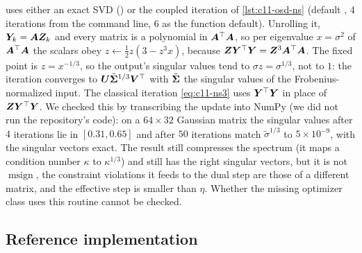 \begin{implnote}[title={In the code: the matrix sign is not the polar factor as written}]
 uses either an exact SVD () or the coupled iteration of
\cref{lst:c11-osd-ns} (default , $4$ iterations from the command line, $6$ as the
function default). Unrolling it, $\bm{Y}_k = \bm{A}\bm{Z}_k$ and every matrix is a polynomial in
$\bm{A}^{\top}\bm{A}$, so per eigenvalue $x = \sigma^2$ of $\bm{A}^{\top}\bm{A}$ the scalars obey
$z \leftarrow \tfrac12 z(3 - z^3x)$, because $\bm{Z}\bm{Y}^{\top}\bm{Y} = \bm{Z}^3\bm{A}^{\top}\bm{A}$. The fixed point is
$z = x^{-1/3}$, so the output's singular values tend to $\sigma z = \sigma^{1/3}$, not to $1$: the
iteration converges to $\bm{U}\tilde{\bm{\Sigma}}^{1/3}\bm{V}^{\top}$ with $\tilde{\bm{\Sigma}}$ the singular values of the
Frobenius-normalized input. The classical iteration \cref{eq:c11-ns3} uses $\bm{Y}^{\top}\bm{Y}$ in place of
$\bm{Z}\bm{Y}^{\top}\bm{Y}$. We checked this by transcribing the update into NumPy (we did not run the
repository's code): on a $64\times32$ Gaussian matrix the singular values after $4$ iterations lie
in $[0.31, 0.65]$ and after $50$ iterations match $\tilde\sigma^{1/3}$ to $5\times10^{-9}$, with the
singular vectors exact. The result still compresses the spectrum (it maps a condition number
$\kappa$ to $\kappa^{1/3}$) and still has the right singular vectors, but it is not
$\operatorname{msign}$, the constraint violations it feeds to the dual step are those of a
different matrix, and the effective step is smaller than $\eta$. Whether the missing optimizer
class uses this routine cannot be checked.
\end{implnote}

\subsection{Reference implementation}\label{sec:c11-mo-ref}

